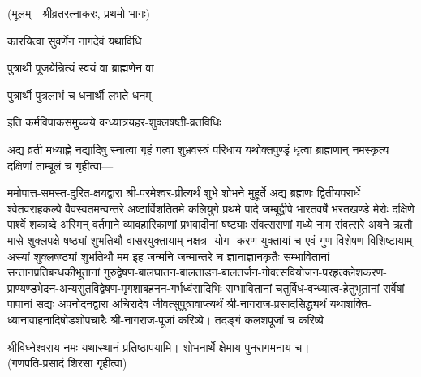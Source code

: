 
\centerline{\small{(मूलम्—श्रीव्रतरत्नाकरः, प्रथमो भागः)}}




{कारयित्वा सुवर्णेन नागदेवं यथाविधि}

{पुत्रार्थी पूजयेन्नित्यं स्वयं वा ब्राह्मणेन वा}

{पुत्रार्थी पुत्रलाभं च धनार्थी लभते धनम्}

{इति कर्मविपाकसमुच्चये वन्ध्यात्रयहर-शुक्लषष्ठी-व्रतविधिः}


अद्य व्रती मध्याह्ने नद्यादिषु स्नात्वा गृहं गत्वा शुभ्रवस्त्रं परिधाय यथोक्तपुण्ड्रं धृत्वा ब्राह्मणान् नमस्कृत्य दक्षिणां ताम्बूलं च गृहीत्वा—

ममोपात्त-समस्त-दुरित-क्षयद्वारा श्री-परमेश्वर-प्रीत्यर्थं शुभे शोभने मुहूर्ते अद्य ब्रह्मणः
द्वितीयपरार्धे श्वेतवराहकल्पे वैवस्वतमन्वन्तरे अष्टाविंशतितमे कलियुगे प्रथमे पादे
जम्बूद्वीपे भारतवर्षे भरतखण्डे मेरोः दक्षिणे पार्श्वे शकाब्दे अस्मिन् वर्तमाने व्यावहारिकाणां
प्रभवादीनां षष्ट्याः संवत्सराणां मध्ये \blank{} नाम संवत्सरे
\blank{} अयने \blank{} ऋतौ \blank{} मासे शुक्लपक्षे षष्ठ्यां शुभतिथौ \blank{} वासरयुक्तायाम्
\blank{} नक्षत्र \blank{}-योग \blank{}-करण-युक्तायां च एवं गुण विशेषण विशिष्टायाम् अस्यां शुक्लषष्ठ्यां शुभतिथौ
मम इह जन्मनि जन्मान्तरे च ज्ञानाज्ञानकृतैः सम्भावितानां सन्तानप्रतिबन्धकीभूतानां
गुरुद्वेषण-बालघातन-बालताडन-बालतर्जन-गोवत्सवियोजन-परहृत्क्लेशकरण-प्राण्यण्डभेदन-अन्यसुतविद्वेषण-मृगशाबहनन-गर्भध्वंसादिभिः सम्भावितानां
चतुर्विध-वन्ध्यात्व-हेतुभूतानां सर्वेषां पापानां सद्यः अपनोदनद्वारा अचिरादेव जीवत्सुपुत्रावाप्त्यर्थं
श्री-नागराज-प्रसादसिद्ध्यर्थं यथाशक्ति-ध्यानावाहनादिषोडशोपचारैः श्री-नागराज-पूजां करिष्ये।
तदङ्गं कलशपूजां च करिष्ये।

श्रीविघ्नेश्वराय नमः यथास्थानं प्रतिष्ठापयामि। शोभनार्थे क्षेमाय पुनरागमनाय च।\\
(गणपति-प्रसादं शिरसा गृहीत्वा)





